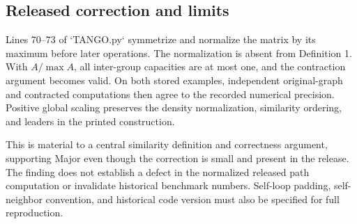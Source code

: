 \documentclass[10pt]{article}
\begin{document}
\subsection*{Released correction and limits}
Lines 70–73 of `TANGO.py` symmetrize and normalize the matrix by its maximum before later operations. The normalization is absent from Definition 1. With \(A/\max A\), all inter-group capacities are at most one, and the contraction argument becomes valid. On both stored examples, independent original-graph and contracted computations then agree to the recorded numerical precision. Positive global scaling preserves the density normalization, similarity ordering, and leaders in the printed construction.\par
This is material to a central similarity definition and correctness argument, supporting Major even though the correction is small and present in the release. The finding does not establish a defect in the normalized released path computation or invalidate historical benchmark numbers. Self-loop padding, self-neighbor convention, and historical code version must also be specified for full reproduction.\par
\end{document}
